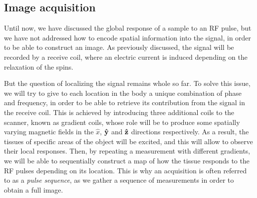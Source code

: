 
\subsection{Image acquisition}\label{sec:imacquisition}
Until now, we have discussed the global response of a sample to an RF pulse, but we have not addressed how to encode spatial information into the signal, in order to be able to construct an image. As previously discussed, the signal will be recorded by a receive coil, where an electric current is induced depending on the relaxation of the spins.

But the question of localizing the signal remains whole so far. To solve this issue, we will try to give to each location in the body a unique combination of phase and frequency, in order to be able to retrieve its contribution from the signal in the receive coil. This is achieved by introducing three additional coils to the scanner, known as gradient coils, whose role will be to produce some spatially varying magnetic fields in the ${\hat{x}}$,  $\mathbf{\hat{y}}$ and  $\mathbf{\hat{z}}$ directions respectively. As a result, the tissues of specific areas of the object will be excited, and this will allow to observe their local responses. Then, by repeating a measurement with different gradients, we will be able to sequentially construct a map of how the tissue responds to the RF pulses depending on its location. This is why an acquisition is often referred to as a \textit{pulse sequence}, as we gather a sequence of measurements in order to obtain a full image. 


